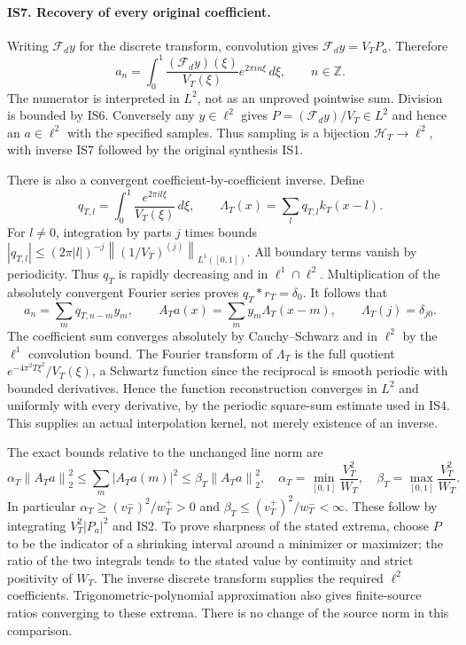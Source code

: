 \documentclass[11pt]{article}
\newcommand{\Z}{\mathbb Z}\newcommand{\C}{\mathbb C}\newcommand{\R}{\mathbb R}
\newcommand{\norm}[1]{\left\|#1\right\|}
\begin{document}
\paragraph{IS7. Recovery of every original coefficient.}
Writing $\mathcal F_dy$ for the discrete transform, convolution gives $\mathcal F_dy=V_TP_a$. Therefore
\begin{equation}
\boxed{a_n=\int_0^1\frac{(\mathcal F_dy)(\xi)}{V_T(\xi)}
 e^{2\pi in\xi}\,d\xi,\qquad n\in\Z.} \tag{IS7}
\end{equation}
The numerator is interpreted in $L^2$, not as an unproved pointwise sum. Division is bounded by IS6. Conversely any $y\in\ell^2$ gives $P=(\mathcal F_dy)/V_T\in L^2$ and hence an $a\in\ell^2$ with the specified samples. Thus sampling is a bijection $\mathcal H_T\to\ell^2$, with inverse IS7 followed by the original synthesis IS1.

There is also a convergent coefficient-by-coefficient inverse. Define
\begin{equation}
q_{T,l}=\int_0^1\frac{e^{2\pi il\xi}}{V_T(\xi)}\,d\xi,\qquad
\Lambda_T(x)=\sum_lq_{T,l}k_T(x-l). \tag{IS7a}
\end{equation}
For $l\ne0$, integration by parts $j$ times bounds
$|q_{T,l}|\le(2\pi|l|)^{-j}\norm{(1/V_T)^{(j)}}_{L^1([0,1])}$.
All boundary terms vanish by periodicity. Thus $q_T$ is rapidly decreasing and in $\ell^1\cap\ell^2$. Multiplication of the absolutely convergent Fourier series proves $q_T*r_T=\delta_0$. It follows that
\begin{equation}
a_n=\sum_mq_{T,n-m}y_m,\qquad
 A_Ta(x)=\sum_my_m\Lambda_T(x-m),\qquad
 \Lambda_T(j)=\delta_{j0}. \tag{IS7b}
\end{equation}
The coefficient sum converges absolutely by Cauchy--Schwarz and in $\ell^2$ by the $\ell^1$ convolution bound. The Fourier transform of $\Lambda_T$ is the full quotient $e^{-4\pi^2T\xi^2}/V_T(\xi)$, a Schwartz function since the reciprocal is smooth periodic with bounded derivatives. Hence the function reconstruction converges in $L^2$ and uniformly with every derivative, by the periodic square-sum estimate used in IS4. This supplies an actual interpolation kernel, not merely existence of an inverse.

The exact bounds relative to the unchanged line norm are
\begin{equation}
\boxed{\alpha_T\norm{A_Ta}_2^2\le\sum_m|A_Ta(m)|^2
 \le\beta_T\norm{A_Ta}_2^2,\quad
 \alpha_T=\min_{[0,1]}\frac{V_T^2}{W_T},\quad
 \beta_T=\max_{[0,1]}\frac{V_T^2}{W_T}.} \tag{IS8}
\end{equation}
In particular $\alpha_T\ge(v_T^-)^2/w_T^+>0$ and
$\beta_T\le(v_T^+)^2/w_T^-<\infty$. These follow by integrating $V_T^2|P_a|^2$ and IS2. To prove sharpness of the stated extrema, choose $P$ to be the indicator of a shrinking interval around a minimizer or maximizer; the ratio of the two integrals tends to the stated value by continuity and strict positivity of $W_T$. The inverse discrete transform supplies the required $\ell^2$ coefficients. Trigonometric-polynomial approximation also gives finite-source ratios converging to these extrema. There is no change of the source norm in this comparison.
\end{document}
